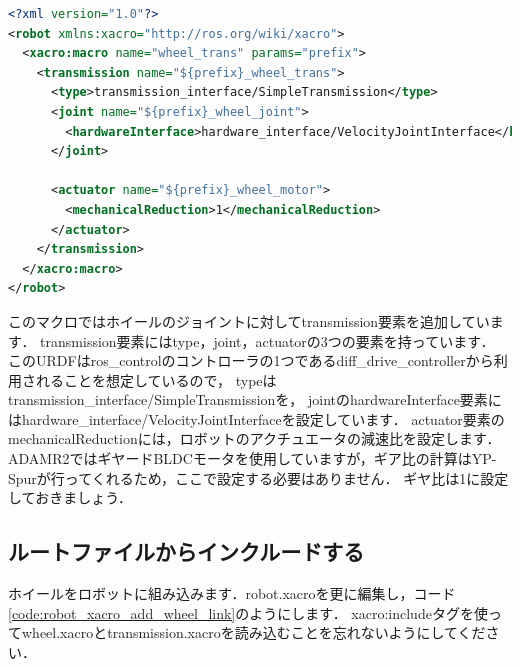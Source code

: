 \documentclass[{../../master}]{subfiles}
\begin{document}
\begin{lstlisting}[language=XML, label=code:transmission_xacro, caption=\textsf{transmission.xacro}]
<?xml version="1.0"?>
<robot xmlns:xacro="http://ros.org/wiki/xacro">
  <xacro:macro name="wheel_trans" params="prefix">
    <transmission name="${prefix}_wheel_trans">
      <type>transmission_interface/SimpleTransmission</type>
      <joint name="${prefix}_wheel_joint">
        <hardwareInterface>hardware_interface/VelocityJointInterface</hardwareInterface>
      </joint>

      <actuator name="${prefix}_wheel_motor">
        <mechanicalReduction>1</mechanicalReduction>
      </actuator>
    </transmission>
  </xacro:macro>
</robot>
\end{lstlisting}

このマクロではホイールのジョイントに対して\textsf{transmission}要素を追加しています．
\textsf{transmission}要素には\textsf{type}，\textsf{joint}，\textsf{actuator}の3つの要素を持っています．
このURDFは\textsf{ros\_control}のコントローラの1つである\textsf{diff\_drive\_controller}から利用されることを想定しているので，
\textsf{type}は\textsf{transmission\_interface/SimpleTransmission}を，
\textsf{joint}の\textsf{hardwareInterface}要素には\textsf{hardware\_interface/VelocityJointInterface}を設定しています．
\textsf{actuator}要素の\textsf{mechanicalReduction}には，ロボットのアクチュエータの減速比を設定します．
ADAMR2ではギヤードBLDCモータを使用していますが，ギア比の計算はYP-Spurが行ってくれるため，ここで設定する必要はありません．
ギヤ比は1に設定しておきましょう．

\subsection{ルートファイルからインクルードする}

ホイールをロボットに組み込みます．\textsf{robot.xacro}を更に編集し，コード\ref{code:robot_xacro_add_wheel_link}のようにします．
\textsf{xacro:include}タグを使って\textsf{wheel.xacro}と\textsf{transmission.xacro}を読み込むことを忘れないようにしてください．
\end{document}
